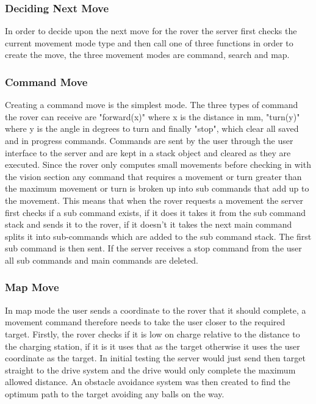 \documentclass[10pt,twoside]{article}
\begin{document}
\subsubsection{Deciding Next Move}
In order to decide upon the next move for the rover the server first checks the current movement mode type and then call one of three functions in order to create the move, the three movement modes are command, search and map.

\subsubsection{Command Move}
Creating a command move is the simplest mode. The three types of command the rover can receive are "forward(x)" where x is the distance in mm, "turn(y)" where y is the angle in degrees to turn and finally "stop", which clear all saved and in progress commands. Commands are sent by the user through the user interface to the server and are kept in a stack object and cleared as they are executed. Since the rover only computes small movements before checking in with the vision section any command that requires a movement or turn greater than the maximum movement or turn is broken up into sub commands that add up to the movement. This means that when the rover requests a movement the server first checks if a sub command exists, if it does it takes it from the sub command stack and sends it to the rover, if it doesn't it takes the next main command splits it into sub-commands which are added to the sub command stack. The first sub command is then sent. If the server receives a stop command from the user all sub commands and main commands are deleted.

\subsubsection{Map Move}
In map mode the user sends a coordinate to the rover that it should complete, a movement command therefore  needs to take the user closer to the required target. Firstly, the rover checks if it is low on charge relative to the distance to the charging station, if it is it uses that as the target otherwise it uses the user coordinate as the target. In initial testing the server would just send then target straight to the drive system and the drive would only complete the maximum allowed distance. An obstacle avoidance system was then created to find the optimum path to the target avoiding any balls on the way.
\end{document}
